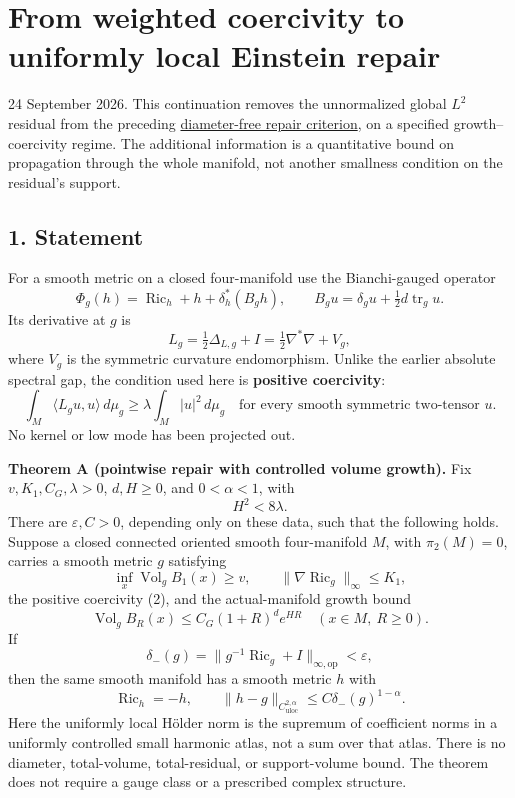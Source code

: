 \documentclass[
  11pt,
]{article}
\author{}
\date{}
\begin{document}
\hypertarget{from-weighted-coercivity-to-uniformly-local-einstein-repair}{%
\section{From weighted coercivity to uniformly local Einstein
repair}\label{from-weighted-coercivity-to-uniformly-local-einstein-repair}}

24 September 2026. This continuation removes the unnormalized global
\(L^2\) residual from the preceding
\href{20260924_local_to_global_scope.md}{diameter-free repair
criterion}, on a specified growth--coercivity regime. The additional
information is a quantitative bound on propagation through the whole
manifold, not another smallness condition on the residual's support.

\hypertarget{statement}{%
\subsection{1. Statement}\label{statement}}

For a smooth metric on a closed four-manifold use the Bianchi-gauged
operator \[
 \Phi_g(h)=\operatorname{Ric}_h+h+\delta_h^*(B_gh),\qquad
 B_gu=\delta_gu+\tfrac12d\operatorname{tr}_gu.
\] Its derivative at \(g\) is \[
 L_g=\tfrac12\Delta_{L,g}+I
     =\tfrac12\nabla^*\nabla+V_g,                            \tag{1}
\] where \(V_g\) is the symmetric curvature endomorphism. Unlike the
earlier absolute spectral gap, the condition used here is
\textbf{positive coercivity}: \[
 \int_M\langle L_gu,u\rangle\,d\mu_g
              \ge\lambda\int_M|u|^2\,d\mu_g
 \quad\text{for every smooth symmetric two-tensor }u.         \tag{2}
\] No kernel or low mode has been projected out.

\textbf{Theorem A (pointwise repair with controlled volume growth).} Fix
\(v,K_1,C_G,\lambda>0\), \(d,H\ge0\), and \(0<\alpha<1\), with \[
                              H^2<8\lambda.                 \tag{3}
\] There are \(\varepsilon,C>0\), depending only on these data, such
that the following holds. Suppose a closed connected oriented smooth
four-manifold \(M\), with \(\pi_2(M)=0\), carries a smooth metric \(g\)
satisfying \[
 \inf_x\operatorname{Vol}_gB_1(x)\ge v,\qquad
 \|\nabla\operatorname{Ric}_g\|_\infty\le K_1,                 \tag{4}
\] the positive coercivity (2), and the actual-manifold growth bound \[
 \operatorname{Vol}_g B_R(x)\le C_G(1+R)^d e^{HR}
       \quad(x\in M,\ R\ge0).                               \tag{5}
\] If \[
 \delta_-(g)=\|g^{-1}\operatorname{Ric}_g+I\|_{\infty,\mathrm{op}}
                    <\varepsilon,                          \tag{6}
\] then the same smooth manifold has a smooth metric \(h\) with \[
 \operatorname{Ric}_h=-h,\qquad
 \|h-g\|_{C^{2,\alpha}_{\mathrm{uloc}}}
                       \le C\delta_-(g)^{1-\alpha}.           \tag{7}
\] Here the uniformly local Hölder norm is the supremum of coefficient
norms in a uniformly controlled small harmonic atlas, not a sum over
that atlas. There is no diameter, total-volume, total-residual, or
support-volume bound. The theorem does not require a gauge class or a
prescribed complex structure.
\end{document}
